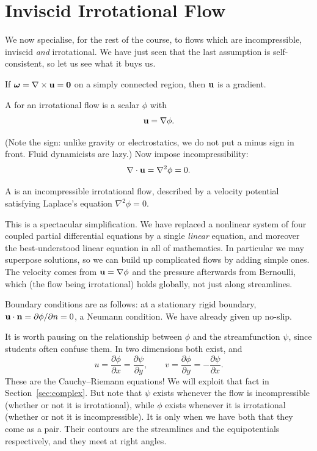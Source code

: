 \documentclass[a4paper]{scrartcl}
\newcommand{\pd}[2]{\frac{\partial #1}{\partial #2}}
\newcommand{\bom}{\boldsymbol{\omega}}
\begin{document}
\section{Inviscid Irrotational Flow}

We now specialise, for the rest of the course, to flows which are incompressible, inviscid \emph{and} irrotational. We have just seen that the last assumption is self-consistent, so let us see what it buys us.

If $\bom = \nabla \times \vv u = \vv 0$ on a simply connected region, then $\mathbf{u}$ is a gradient.

\begin{definition}
	A  for an irrotational flow is a scalar $\phi$ with
	$$
	\mathbf{u} = \nabla \phi.
	$$
\end{definition}

(Note the sign: unlike gravity or electrostatics, we do not put a minus sign in front. Fluid dynamicists are lazy.) Now impose incompressibility:
$$
\nabla \cdot \mathbf{u} = \nabla^2 \phi = 0.
$$

\begin{definition}
	A  is an incompressible irrotational flow, described by a velocity potential satisfying Laplace's equation $\nabla^2 \phi = 0$.
\end{definition}

This is a spectacular simplification. We have replaced a nonlinear system of four coupled partial differential equations by a single \emph{linear} equation, and moreover the best-understood linear equation in all of mathematics. In particular we may superpose solutions, so we can build up complicated flows by adding simple ones. The velocity comes from $\mathbf{u} = \nabla \phi$ and the pressure afterwards from Bernoulli, which (the flow being irrotational) holds globally, not just along streamlines.

Boundary conditions are as follows: at a stationary rigid boundary, $\mathbf{u} \cdot \mathbf{n} = \partial \phi/\partial n = 0$, a Neumann condition. We have already given up no-slip.

It is worth pausing on the relationship between $\phi$ and the streamfunction $\psi$, since students often confuse them. In two dimensions both exist, and
$$
u = \pd{\phi}{x} = \pd{\psi}{y}, \qquad v = \pd{\phi}{y} = -\pd{\psi}{x}.
$$
These are the Cauchy--Riemann equations! We will exploit that fact in Section~\ref{sec:complex}. But note that $\psi$ exists whenever the flow is incompressible (whether or not it is irrotational), while $\phi$ exists whenever it is irrotational (whether or not it is incompressible). It is only when we have both that they come as a pair. Their contours are the streamlines and the equipotentials respectively, and they meet at right angles.
\end{document}

